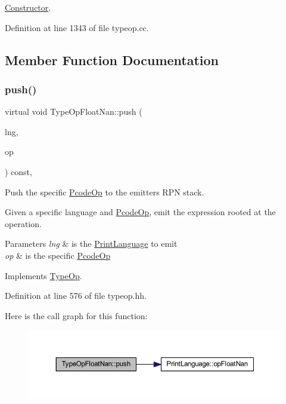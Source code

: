 \mbox{\hyperlink{class_constructor}{Constructor}}. 



Definition at line 1343 of file typeop.\+cc.



\subsection{Member Function Documentation}
\mbox{\label{class_type_op_float_nan_adf90c4fb0d1d2715c064ad1f963b534a}} 
\subsubsection{\texorpdfstring{push()}{push()}}
{\footnotesize\ttfamily virtual void Type\+Op\+Float\+Nan\+::push (\begin{DoxyParamCaption}\item[{\mbox{\hyperlink{class_print_language}{Print\+Language}} $\ast$}]{lng,  }\item[{const \mbox{\hyperlink{class_pcode_op}{Pcode\+Op}} $\ast$}]{op }\end{DoxyParamCaption}) const\hspace{0.3cm}{\ttfamily [inline]}, {\ttfamily [virtual]}}



Push the specific \mbox{\hyperlink{class_pcode_op}{Pcode\+Op}} to the emitter\textquotesingle{}s R\+PN stack. 

Given a specific language and \mbox{\hyperlink{class_pcode_op}{Pcode\+Op}}, emit the expression rooted at the operation. 
\begin{DoxyParams}{Parameters}
{\em lng} & is the \mbox{\hyperlink{class_print_language}{Print\+Language}} to emit \\
\hline
{\em op} & is the specific \mbox{\hyperlink{class_pcode_op}{Pcode\+Op}} \\
\hline
\end{DoxyParams}


Implements \mbox{\hyperlink{class_type_op_ac9c9544203ed74dabe6ac662b653b2af}{Type\+Op}}.



Definition at line 576 of file typeop.\+hh.

Here is the call graph for this function\+:
\nopagebreak
\begin{figure}[H]
\begin{center}
\leavevmode
\includegraphics[width=350pt]{class_type_op_float_nan_adf90c4fb0d1d2715c064ad1f963b534a_cgraph}
\end{center}
\end{figure}


